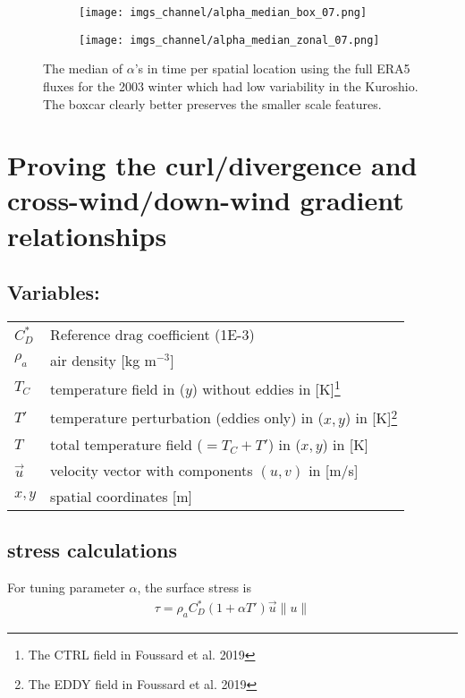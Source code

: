 \documentclass[12pt,a4paper]{article}
\begin{document}
\begin{figure}[h!]
\centering
\begin{subfigure}[t]{\textwidth}
\texttt{[image: imgs\_channel/alpha\_median\_box\_07.png]}
\end{subfigure}
\begin{subfigure}[t]{\textwidth}
\texttt{[image: imgs\_channel/alpha\_median\_zonal\_07.png]}
\end{subfigure}
\caption{The median of $\alpha$'s in time per spatial location using the full ERA5 fluxes for the 2003 winter which had low variability in the Kuroshio. The boxcar clearly better preserves the smaller scale features.}
\end{figure}




\appendix
\section{Proving the curl/divergence and cross-wind/down-wind gradient relationships}
\subsection*{Variables:}
\begin{table}[h!]
\begin{tabular}{ll}
 $C_D^*$ &  Reference drag coefficient (1E-3) \\
 $\rho_a$ &  air density [kg m$^{-3}$] \\
 $T_C$ & temperature field in ($y$) without eddies in [K]\footnote{The CTRL field in Foussard et al. 2019}  \\
 $T'$ & temperature perturbation (eddies only) in ($x,y$) in [K]\footnote{The EDDY field in Foussard et al. 2019}  \\
  $T$ & total temperature field ($=T_C + T'$) in ($x,y$) in [K]  \\
 $\vec{u}$ & velocity vector with components $(u,v)$ in [m/s] \\
 $x,y$ & spatial coordinates [m]
\end{tabular}
\end{table}

\subsection{stress calculations}
For tuning parameter $\alpha$, the surface stress is 
\begin{align*}
\tau = \rho_a C_D^*(1+\alpha T')\vec{u}\lVert u \rVert
\end{align*}
\end{document}

